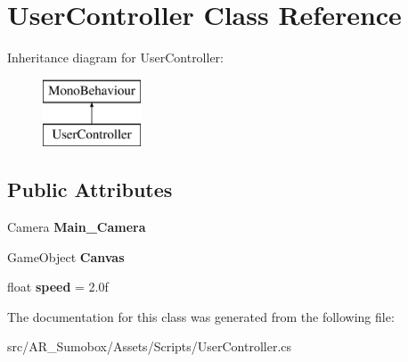 \hypertarget{class_user_controller}{}\section{User\+Controller Class Reference}
\label{class_user_controller}
Inheritance diagram for User\+Controller\+:\begin{figure}[H]
\begin{center}
\leavevmode
\includegraphics[height=2.000000cm]{class_user_controller}
\end{center}
\end{figure}
\subsection*{Public Attributes}
\begin{DoxyCompactItemize}
\item 
\mbox{\label{class_user_controller_a154397b4fa32f210f7c3a4f522e675a3}} 
Camera {\bfseries Main\+\_\+\+Camera}
\item 
\mbox{\label{class_user_controller_aba96ac433b3eeabe947cc96102a89bb6}} 
Game\+Object {\bfseries Canvas}
\item 
\mbox{\label{class_user_controller_a1fbf0acd74af79aee3ba6928fed0f18a}} 
float {\bfseries speed} = 2.\+0f
\end{DoxyCompactItemize}


The documentation for this class was generated from the following file\+:\begin{DoxyCompactItemize}
\item 
src/\+A\+R\+\_\+\+Sumobox/\+Assets/\+Scripts/User\+Controller.\+cs\end{DoxyCompactItemize}
